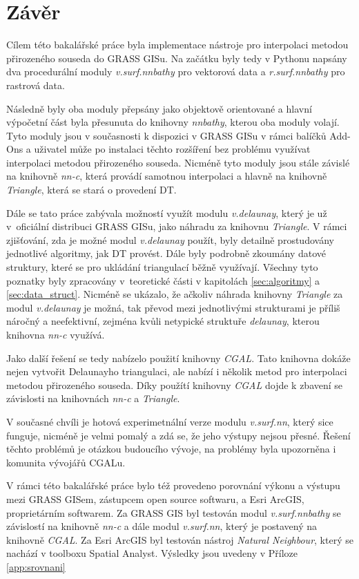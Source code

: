 \documentclass[12pt,a4paper]{article}
\newcommand{\necislovana}[1]{%
\phantomsection
\addcontentsline{toc}{section}{#1}



\section*{#1}
\markboth{\uppercase{#1}}{}
}
\begin{document}
\newpage
\necislovana{Závěr}

Cílem této bakalářské práce byla implementace nástroje pro interpolaci
metodou přirozeného souseda do GRASS GISu. Na začátku byly tedy v
Pythonu napsány dva procedurální moduly \emph{v.surf.nnbathy} pro vektorová data a
\emph{r.surf.nnbathy} pro rastrová data.

Následně byly oba moduly přepsány jako objektově orientované a 
hlavní výpočetní část byla přesunuta do knihovny \emph{nnbathy}, 
kterou oba moduly volají. Tyto moduly jsou v
současnosti k dispozici v GRASS GISu v rámci balíčků Add-Ons a
uživatel může po instalaci těchto rozšíření bez problému využívat
interpolaci metodou přirozeného souseda. Nicméně tyto moduly jsou
stále závislé na knihovně \emph{nn-c}, která provádí samotnou
interpolaci a hlavně na knihovně \emph{Triangle}, která se stará o
provedení DT.

Dále se tato práce zabývala možností využít modulu \emph{v.delaunay},
který je už v~oficiální distribuci GRASS GISu, jako náhradu za
knihovnu \emph{Triangle}. V rámci zjišťování, zda je možné modul
\emph{v.delaunay} použít, byly detailně prostudovány jednotlivé
algoritmy, jak DT provést. Dále byly podrobně zkoumány datové
struktury, které se pro ukládání triangulací běžně využívají. Všechny
tyto poznatky byly zpracovány v~teoretické části v kapitolách
\ref{sec:algoritmy} a \ref{sec:data_struct}. Nicméně se ukázalo, že
ačkoliv náhrada knihovny \emph{Triangle} za modul \emph{v.delaunay} je
možná, tak převod mezi jednotlivými strukturami je příliš náročný a
neefektivní, zejména kvůli netypické struktuře \emph{delaunay}, kterou
knihovna \emph{nn-c} využívá.

Jako další řešení se tedy nabízelo použití knihovny \emph{CGAL}. Tato
knihovna dokáže nejen vytvořit Delaunayho triangulaci, ale nabízí i
několik metod pro interpolaci metodou přirozeného souseda. Díky
použítí knihovny \emph{CGAL} dojde k zbavení se závislosti na
knihovnách \emph{nn-c} a \emph{Triangle}. 

V současné chvíli je hotová
experimetnální verze modulu \emph{v.surf.nn}, který sice funguje,
nicméně je velmi pomalý a zdá se, že jeho výstupy nejsou přesné.
Řešení těchto problémů je otázkou budoucího vývoje, na problémy
byla upozorněna i komunita vývojářů CGALu.

V rámci této bakalářské práce bylo též provedeno porovnání výkonu a
výstupu mezi GRASS GISem, zástupcem open source softwaru, a Esri ArcGIS,
proprietárním softwarem. Za GRASS GIS byl testován modul
\emph{v.surf.nnbathy} se závislostí na knihovně \emph{nn-c} a dále
modul \emph{v.surf.nn}, který je postavený na knihovně \emph{CGAL}. Za
Esri ArcGIS byl testován nástroj \emph{Natural Neighbour}, který se nachází
v toolboxu Spatial Analyst. Výsledky jsou uvedeny v Příloze
\ref{app:srovnani}
\end{document}

